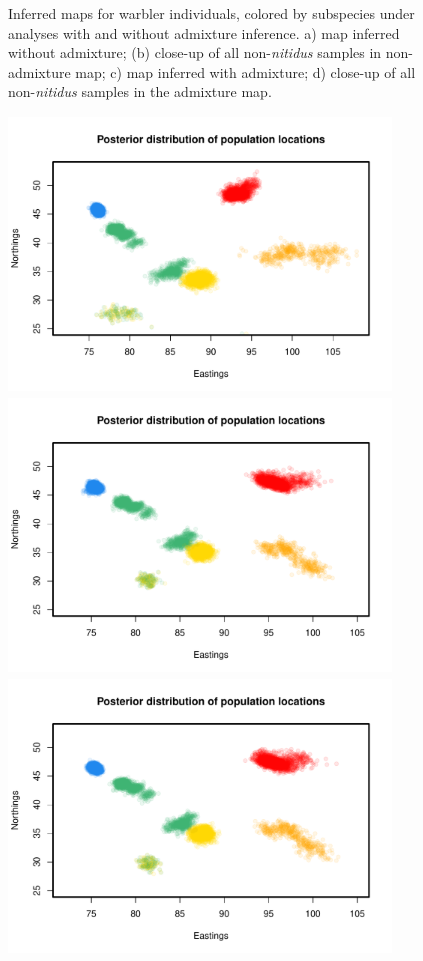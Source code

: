 \documentclass[12pt]{article}
\begin{document}
\begin{figure}
	\caption{
    Inferred maps for warbler individuals, colored by subspecies under analyses with and without admixture inference. a) map inferred without admixture; (b) close-up of all non-\textit{nitidus} samples in non-admixture map; c) map inferred with admixture; d) close-up of all non-\textit{nitidus} samples in the admixture map.}\label{sfig:warbler_ind_maps_compare}
\end{figure}

\begin{figure}
	\centering
			{\includegraphics[width=4in,height=2.88in]{figs/warblers/warb_inds_ad_post_map_randpr2.pdf}}
			{\includegraphics[width=4in,height=2.88in]{figs/warblers/warb_inds_ad_post_map_realpr1.pdf}}
			{\includegraphics[width=4in,height=2.88in]{figs/warblers/warb_inds_ad_post_map_realpr2.pdf}}

\end{figure}
\end{document}
